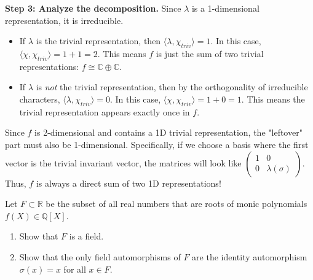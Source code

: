 \begin{solution}
\textbf{Step 3: Analyze the decomposition.}
Since $\lambda$ is a 1-dimensional representation, it is irreducible.
\begin{itemize}
    \item If $\lambda$ is the trivial representation, then $\langle \lambda, \chi_{triv} \rangle = 1$. In this case, $\langle \chi, \chi_{triv} \rangle = 1 + 1 = 2$. This means $f$ is just the sum of two trivial representations: $f \cong \mathbb{C} \oplus \mathbb{C}$.
    \item If $\lambda$ is \textit{not} the trivial representation, then by the orthogonality of irreducible characters, $\langle \lambda, \chi_{triv} \rangle = 0$. In this case, $\langle \chi, \chi_{triv} \rangle = 1 + 0 = 1$. This means the trivial representation appears exactly once in $f$.
\end{itemize}
Since $f$ is 2-dimensional and contains a 1D trivial representation, the "leftover" part must also be 1-dimensional. 
Specifically, if we choose a basis where the first vector is the trivial invariant vector, the matrices will look like $\begin{pmatrix} 1 & 0 \\ 0 & \lambda(\sigma) \end{pmatrix}$.
Thus, $f$ is always a direct sum of two 1D representations!
\end{solution}

\begin{exercise}
\label{algebra:2011:3}
Let $F \subset \mathbb{R}$ be the subset of all real numbers that are roots of monic polynomials $f(X) \in \mathbb{Q}[X]$.
\begin{enumerate}
    \item Show that $F$ is a field.
    \item Show that the only field automorphisms of $F$ are the identity automorphism $\sigma(x) = x$ for all $x \in F$.
\end{enumerate}
\end{exercise}


